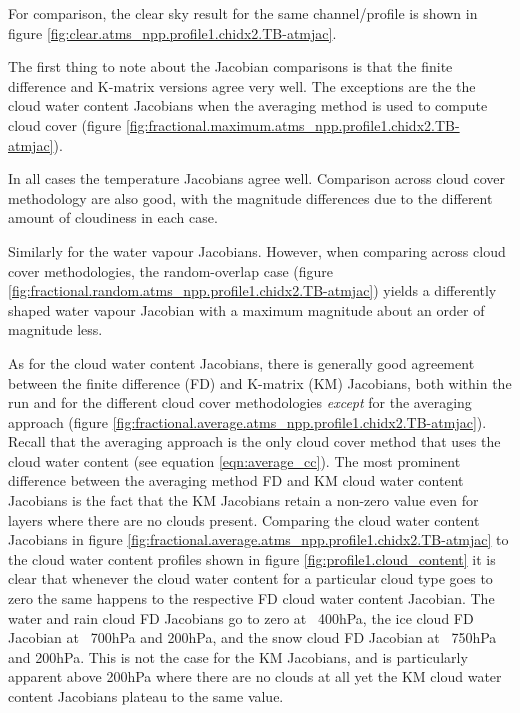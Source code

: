 For comparison, the clear sky result for the same channel/profile is shown in figure \ref{fig:clear.atms_npp.profile1.chidx2.TB-atmjac}.

The first thing to note about the Jacobian comparisons is that the finite difference and K-matrix versions agree very well. The exceptions are the the cloud water content Jacobians when the averaging method is used to compute cloud cover (figure \ref{fig:fractional.maximum.atms_npp.profile1.chidx2.TB-atmjac}).

In all cases the temperature Jacobians agree well. Comparison across cloud cover methodology are also good, with the magnitude differences due to the different amount of cloudiness in each case.

Similarly for the water vapour Jacobians. However, when comparing across cloud cover methodologies, the random-overlap case (figure \ref{fig:fractional.random.atms_npp.profile1.chidx2.TB-atmjac}) yields a differently shaped water vapour Jacobian with a maximum magnitude about an order of magnitude less.

As for the cloud water content Jacobians, there is generally good agreement between the finite difference (FD) and K-matrix (KM) Jacobians, both within the run and for the different cloud cover methodologies \emph{except} for the averaging approach (figure \ref{fig:fractional.average.atms_npp.profile1.chidx2.TB-atmjac}). Recall that the averaging approach is the only cloud cover method that uses the cloud water content (see equation \ref{eqn:average_cc}). The most prominent difference between the averaging method FD and KM cloud water content Jacobians is the fact that the KM Jacobians retain a non-zero value even for layers where there are no clouds present. Comparing the cloud water content Jacobians in figure \ref{fig:fractional.average.atms_npp.profile1.chidx2.TB-atmjac} to the cloud water content profiles shown in figure \ref{fig:profile1.cloud_content} it is clear that whenever the cloud water content for a particular cloud type goes to zero the same happens to the respective FD cloud water content Jacobian. The water and rain cloud FD Jacobians go to zero at ~400hPa, the ice cloud FD Jacobian at ~700hPa and 200hPa, and the snow cloud FD Jacobian at ~750hPa and 200hPa. This is not the case for the KM Jacobians, and is particularly apparent above 200hPa where there are no clouds at all yet the KM cloud water content Jacobians plateau to the same value.


